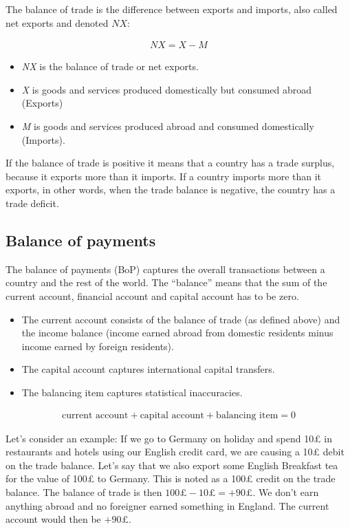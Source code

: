 \documentclass[
]{book}
\providecommand{\tightlist}{%
  \setlength{\itemsep}{0pt}\setlength{\parskip}{0pt}}
\begin{document}
The balance of trade is the difference between exports and imports, also called net exports and denoted \(NX\):

\begin{align}
  NX=X-M
\end{align}

\begin{itemize}
\tightlist
\item
  \emph{NX} is the balance of trade or net exports.
\item
  \emph{X} is goods and services produced domestically but consumed abroad (Exports)
\item
  \emph{M} is goods and services produced abroad and consumed domestically (Imports).
\end{itemize}

If the balance of trade is positive it means that a country has a trade surplus, because it exports more than it imports. If a country imports more than it exports, in other words, when the trade balance is negative, the country has a trade deficit.

\hypertarget{balance-of-payments}{%
\subsection*{Balance of payments}\label{balance-of-payments}}

The balance of payments (BoP) captures the overall transactions between a country and the rest of the world. The ``balance'' means that the sum of the current account, financial account and capital account has to be zero.

\begin{itemize}
\tightlist
\item
  The current account consists of the balance of trade (as defined above) and the income balance (income earned abroad from domestic residents minus income earned by foreign residents).
\item
  The capital account captures international capital transfers.
\item
  The balancing item captures statistical inaccuracies.
\end{itemize}

\begin{align}
  \text{current account}+\text{capital account}+\text{balancing item}=0 
\end{align}

Let's consider an example: If we go to Germany on holiday and spend 10£ in restaurants and hotels using our English credit card, we are causing a 10£ debit on the trade balance. Let's say that we also export some English Breakfast tea for the value of 100£ to Germany. This is noted as a 100£ credit on the trade balance. The balance of trade is then \(100£-10£=+90£\). We don't earn anything abroad and no foreigner earned something in England. The current account would then be \(+90£\).
\end{document}
